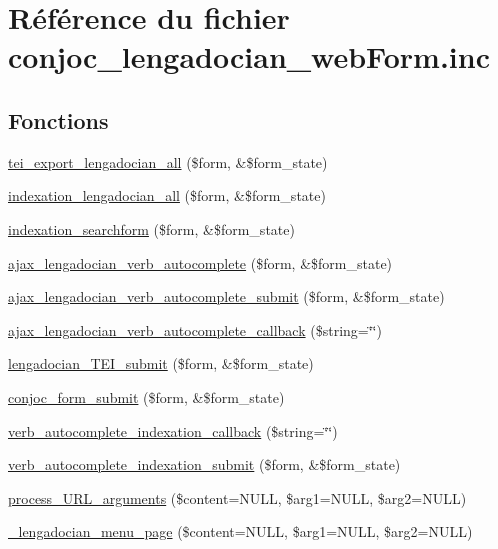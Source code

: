\hypertarget{conjoc__lengadocian__web_form_8inc}{}\section{Référence du fichier conjoc\+\_\+lengadocian\+\_\+web\+Form.\+inc}
\label{conjoc__lengadocian__web_form_8inc}
\subsection*{Fonctions}
\begin{DoxyCompactItemize}
\item 
\hyperlink{conjoc__lengadocian__web_form_8inc_a9c7725a828c1a44761bc51fe7a346215}{tei\+\_\+export\+\_\+lengadocian\+\_\+all} (\$form, \&\$form\+\_\+state)
\item 
\hyperlink{conjoc__lengadocian__web_form_8inc_a465cce16b0d09f364ccb546c46c82306}{indexation\+\_\+lengadocian\+\_\+all} (\$form, \&\$form\+\_\+state)
\item 
\hyperlink{conjoc__lengadocian__web_form_8inc_a3f7b0b4a8f4301190850532d5488c54a}{indexation\+\_\+searchform} (\$form, \&\$form\+\_\+state)
\item 
\hyperlink{conjoc__lengadocian__web_form_8inc_a95265729a90a0b79d7d98483fce78880}{ajax\+\_\+lengadocian\+\_\+verb\+\_\+autocomplete} (\$form, \&\$form\+\_\+state)
\item 
\hyperlink{conjoc__lengadocian__web_form_8inc_a2206d720f533b7b1afa6ac0568e740ef}{ajax\+\_\+lengadocian\+\_\+verb\+\_\+autocomplete\+\_\+submit} (\$form, \&\$form\+\_\+state)
\item 
\hyperlink{conjoc__lengadocian__web_form_8inc_a26cea88ddc504d14492fa9fd58a060b4}{ajax\+\_\+lengadocian\+\_\+verb\+\_\+autocomplete\+\_\+callback} (\$string=\char`\"{}\char`\"{})
\item 
\hyperlink{conjoc__lengadocian__web_form_8inc_a704a4de756f6a38064970e97d4a2bc6c}{lengadocian\+\_\+\+T\+E\+I\+\_\+submit} (\$form, \&\$form\+\_\+state)
\item 
\hyperlink{conjoc__lengadocian__web_form_8inc_ad10d751f3d75ba568eb1f41bd43fcc94}{conjoc\+\_\+form\+\_\+submit} (\$form, \&\$form\+\_\+state)
\item 
\hyperlink{conjoc__lengadocian__web_form_8inc_a378d4601a46c698692d26cb301470598}{verb\+\_\+autocomplete\+\_\+indexation\+\_\+callback} (\$string=\char`\"{}\char`\"{})
\item 
\hyperlink{conjoc__lengadocian__web_form_8inc_a5e7b0be9cab73b5b2be66499afd0edc5}{verb\+\_\+autocomplete\+\_\+indexation\+\_\+submit} (\$form, \&\$form\+\_\+state)
\item 
\hyperlink{conjoc__lengadocian__web_form_8inc_afecc813b5558b906fe6cc9adb1419c35}{process\+\_\+\+U\+R\+L\+\_\+arguments} (\$content=N\+U\+LL, \$arg1=N\+U\+LL, \$arg2=N\+U\+LL)
\item 
\hyperlink{conjoc__lengadocian__web_form_8inc_a4ffe99e612db8d794975a33aefb781f7}{\+\_\+lengadocian\+\_\+menu\+\_\+page} (\$content=N\+U\+LL, \$arg1=N\+U\+LL, \$arg2=N\+U\+LL)
\end{DoxyCompactItemize}


